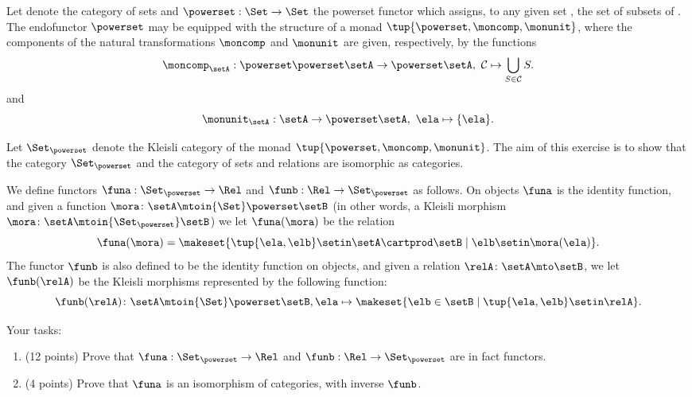 \begin{gradedexercise}
    \label{ex:HwkRelKleisli}

Let \Set denote the category of sets and $\powerset : \Set \to \Set$ the powerset functor which assigns, to any given set \setA, the set of subsets of \setA.
The endofunctor $\powerset$ may be equipped with the structure of a monad $\tup{\powerset, \moncomp, \monunit}$, where the components of the natural transformations $\moncomp$ and $\monunit$ are given, respectively, by the functions
    \begin{equation}
    \moncomp_{\setA} : \powerset \powerset \setA \to \powerset \setA, \ \mathcal{C} \mapsto \bigcup_{S \in \mathcal{C}} S.
\end{equation}
and
\begin{equation}
    \monunit_{\setA} : \setA \to \powerset \setA, \ \ela \mapsto \{ \ela \}.
\end{equation}
   

Let $\Set_{\powerset}$ denote the Kleisli category of the monad $\tup{\powerset, \moncomp, \monunit}$. The aim of this  exercise is to show that the category $\Set_{\powerset}$ and the category \Rel of sets and relations are isomorphic as categories. 

We define functors $\funa: \Set_{\powerset} \to \Rel$ and $\funb: \Rel \to \Set_{\powerset}$ as follows. On objects $\funa$ is the identity function, and given a function $\mora \colon \setA \mtoin{\Set} \powerset \setB$ (in other words, a Kleisli morphism $\mora \colon \setA \mtoin{\Set_{\powerset}} \setB$) we let $\funa(\mora)$ be the relation 
\begin{equation}
\funa(\mora) = \makeset{\tup{\ela, \elb} \setin \setA \cartprod \setB \mid \elb \setin \mora(\ela)}.
\end{equation}
The functor $\funb$ is also defined to be the identity function on objects, and given a relation $\relA \colon \setA \mto \setB$, we let $\funb(\relA)$ be the Kleisli morphisms represented by the following function: 
\begin{equation}
\funb(\relA)\colon \setA \mtoin{\Set} \powerset \setB, \ela \mapsto \makeset{\elb \in \setB \mid \tup{\ela, \elb} \setin \relA}.
\end{equation}

    
    Your tasks:
    \begin{enumerate}
        \item (12 points) Prove that $\funa: \Set_{\powerset} \to \Rel$ and $\funb: \Rel \to \Set_{\powerset}$ are in fact functors.
        \item (4 points) Prove that $\funa$ is an isomorphism of categories, with inverse $\funb$.
    \end{enumerate}
\end{gradedexercise}

